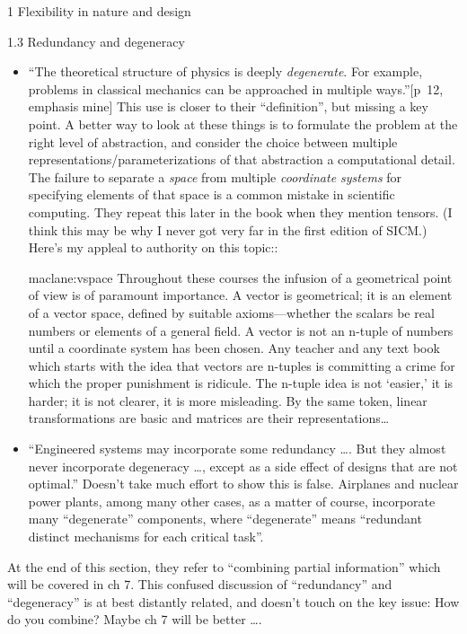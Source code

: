 \documentclass[12pt]{PalisadesLakesBook}
\begin{document}
\begin{plSection}{1 Flexibility in nature and design}
\begin{plSection}{1.3 Redundancy and degeneracy}
\begin{itemize}
  \item ``The theoretical structure of physics is deeply 
\emph{degenerate}.
For example, problems in classical mechanics can be approached
in multiple ways.''[p~12, emphasis mine]
This use is closer to their ``definition'',
but missing a key point. 
A better way to look at these things is to formulate 
the problem at the right level of abstraction,
and consider the choice between 
multiple representations/parameterizations of that abstraction
a computational detail.
The failure to separate a \emph{space} 
from multiple \emph{coordinate systems} for specifying
elements of that space is a common mistake 
in scientific computing.
They repeat this later in the book when they mention tensors.
(I think this may be why I never got very far 
in the first edition of SICM.)
Here's my appleal to authority on this topic::
\begin{plQuote}
{}
{maclane:vspace}
Throughout these courses the infusion of a geometrical
point of view is of paramount importance. A vector
is geometrical; it is an element of a vector space, defined
by suitable axioms—whether the scalars be real numbers or
elements of a general field. A vector is not an n-tuple of
numbers until a coordinate system has been chosen. Any
teacher and any text book which starts with the idea that vectors
are n-tuples is committing a crime for which the proper
punishment is ridicule. The n-tuple idea is not ‘easier,’ it is
harder; it is not clearer, it is more misleading. By the same
token, linear transformations are basic and matrices are their
representations\ldots
\end{plQuote}

\item ``Engineered systems may incorporate some redundancy 
{\ldots}.
But they almost never incorporate degeneracy {\ldots},
except as a side effect of designs that are not optimal.''
Doesn't take much effort to show this is false.
Airplanes and nuclear power plants, among many other cases,
as a matter of course, incorporate many ``degenerate'' components,
where ``degenerate'' means 
``redundant distinct mechanisms for each critical task''.

\end{itemize}

At the end of this section, they refer to 
``combining partial information'' which will be covered in ch 7.
This confused discussion of ``redundancy'' and ``degeneracy''
is at best distantly related, and doesn't touch 
on the key issue: How do you combine?
Maybe ch 7 will be better {\ldots}.


\end{plSection}
\end{plSection}
\end{document}
